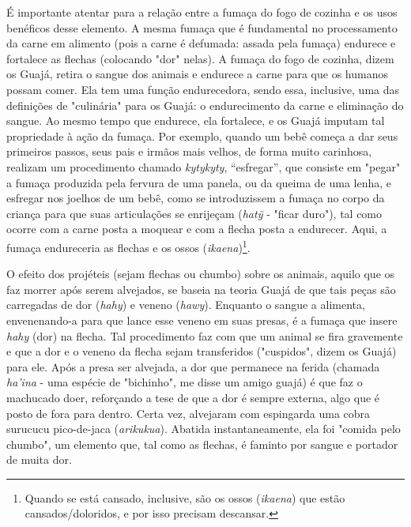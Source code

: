É importante atentar para a relação entre a fumaça do fogo de cozinha e
os usos benéficos desse elemento. A mesma fumaça que é fundamental no
processamento da carne em alimento (pois a carne é defumada: assada pela
fumaça) endurece e fortalece as flechas (colocando "dor" nelas). A
fumaça do fogo de cozinha, dizem os Guajá, retira o sangue dos animais e
endurece a carne para que os humanos possam comer. Ela tem uma função
endurecedora, sendo essa, inclusive, uma das definições de "culinária"
para os Guajá: o endurecimento da carne e eliminação do sangue. Ao mesmo
tempo que endurece, ela fortalece, e os Guajá imputam tal propriedade à
ação da fumaça. Por exemplo, quando um bebê começa a dar seus primeiros
passos, seus pais e irmãos mais velhos, de forma muito carinhosa,
realizam um procedimento chamado \emph{kytykyty}, ``esfregar'', que
consiste em "pegar" a fumaça produzida pela fervura de uma panela, ou da
queima de uma lenha, e esfregar nos joelhos de um bebê, como se
introduzissem a fumaça no corpo da criança para que suas articulações se
enrijeçam (\emph{hatỹ} - "ficar duro"), tal como ocorre com a carne
posta a moquear e com a flecha posta a endurecer. Aqui, a fumaça
endureceria as flechas e os ossos (\emph{ikaena})\footnote{Quando se
  está cansado, inclusive, são os ossos (\emph{ikaena}) que estão
  cansados/doloridos, e por isso precisam descansar.}.

O efeito dos projéteis (sejam flechas ou chumbo) sobre os animais,
aquilo que os faz morrer após serem alvejados, se baseia na teoria Guajá
de que tais peças são carregadas de dor (\emph{hahy}) e veneno
(\emph{hawy}). Enquanto o sangue a alimenta, envenenando-a para que
lance esse veneno em suas presas, é a fumaça que insere \emph{hahy}
(dor) na flecha. Tal procedimento faz com que um animal se fira
gravemente e que a dor e o veneno da flecha sejam transferidos
("cuspidos", dizem os Guajá) para ele. Após a presa ser alvejada, a dor
que permanece na ferida (chamada \emph{ha'ina} - uma espécie de
"bichinho", me disse um amigo guajá) é que faz o machucado doer,
reforçando a tese de que a dor é sempre externa, algo que é posto de
fora para dentro. Certa vez, alvejaram com espingarda uma cobra surucucu
pico-de-jaca (\emph{arikukua}). Abatida instantaneamente, ela foi
"comida pelo chumbo", um elemento que, tal como as flechas, é faminto
por sangue e portador de muita dor.

